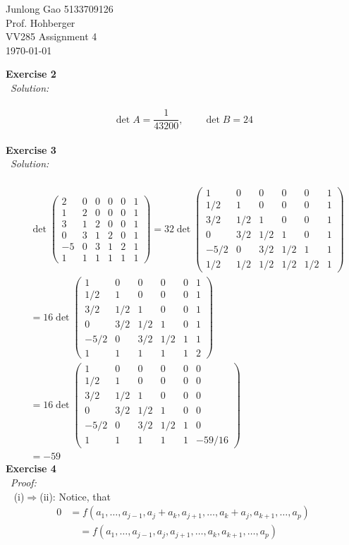 \documentclass[12pt]{article}
\def\es#1#2{{\bf Exercise #1}\\~{\it Solution:}\\~#2\\[1em]}
\def\ep#1#2{{\bf Exercise #1}\\~{\it Proof:}\\~#2\\[1em]}
\newcommand{\eq}[1]{\begin{align*}#1\end{align*}}
\begin{document}
 
\begin{flushleft}
  Junlong Gao 5133709126\\ 
  Prof.  Hohberger\\ 
  VV285 Assignment 4\\
  \today 
\end{flushleft}

\es{2}{
\[
\det A=\frac{1}{43200},\qquad\det B=24
\]
}
\es{3}{
\eq{
&\det\begin{pmatrix}
2&0&0&0&0&1\\
1&2&0&0&0&1\\
3&1&2&0&0&1\\
0&3&1&2&0&1\\
-5&0&3&1&2&1\\
1&1&1&1&1&1
\end{pmatrix}
=
32\det\begin{pmatrix}
1    &0    &0   &0   &0&1\\
1/2 &1    &0   &0   &0&1\\
3/2 &1/2 &1   &0   &0&1\\
0    &3/2    &1/2&1   &0&1\\
-5/2&0    &3/2   &1/2&1&1\\
1/2 &1/2 &1/2   &1/2&1/2&1
\end{pmatrix}\\
&
=16\det\begin{pmatrix}
1    &0    &0   &0   &0&1\\
1/2 &1    &0   &0   &0&1\\
3/2 &1/2 &1   &0   &0&1\\
0    &3/2    &1/2&1   &0&1\\
-5/2&0    &3/2   &1/2&1&1\\
1 &1 &1   &1 &1&2
\end{pmatrix}\\
&=16\det\begin{pmatrix}
1    &0    &0   &0   &0&0\\
1/2 &1    &0   &0   &0&0\\
3/2 &1/2 &1   &0   &0&0\\
0    &3/2    &1/2&1   &0&0\\
-5/2&0    &3/2   &1/2&1&0\\
1 &1 &1   &1 &1&-59/16
\end{pmatrix}\\
&=-59
}
\ep{4}{
(i)$\Longrightarrow$(ii):
Notice, that
\eq{
0&=f(a_1,\ldots,a_{j-1},a_j+a_k,a_{j+1},\ldots,a_k+a_j,a_{k+1},\ldots,a_p)\\
&\quad=f(a_1,\ldots,a_{j-1},a_j,a_{j+1},\ldots,a_k,a_{k+1},\ldots,a_p)\\
}}}
\end{document}

